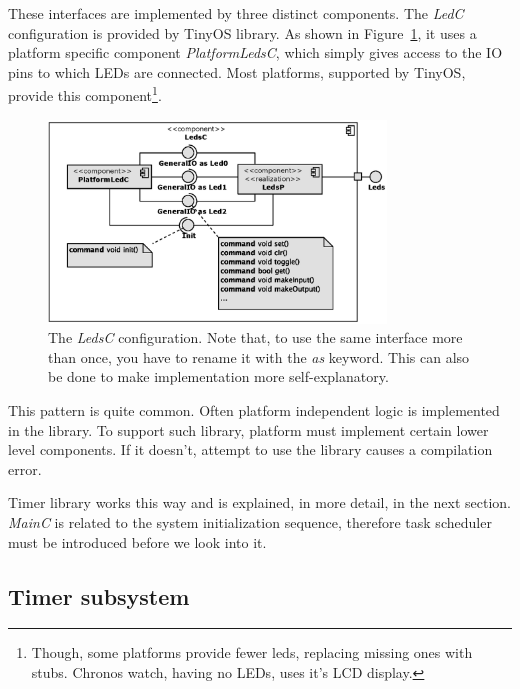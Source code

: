 These interfaces are implemented by three distinct components.
The \emph{LedC} configuration is provided by TinyOS library.
As shown in Figure~\ref{fig:ledc}, it uses a platform specific component
\emph{PlatformLedsC}, which simply gives access to the IO pins to
which LEDs are connected. Most platforms, supported by TinyOS, provide
this component\footnote{Though, some platforms provide fewer leds,
replacing missing ones with stubs. Chronos watch, having no LEDs,
uses it's LCD display.}.
\begin{figure}[h]
  \centering
  \includegraphics[width=0.8\textwidth]{diagrams/ledsc.eps}
  \caption{The \emph{LedsC} configuration. Note that, to use the same
  interface more than once, you have to rename it with the \emph{as}
  keyword.  This can also be done to make implementation more
  self-explanatory.}
  \label{fig:ledc}
\end{figure}

This pattern is quite common. Often platform independent logic is
implemented in the library. To support such library, platform must
implement certain lower level components.  If it doesn't, attempt to
use the library causes a compilation error.

Timer library works this way and is explained, in more detail, in the
next section. \emph{MainC} is related to the system initialization
sequence, therefore task scheduler must be introduced before we look into
it.

\subsection{Timer subsystem}
\label{ch:timer_subsystem}

